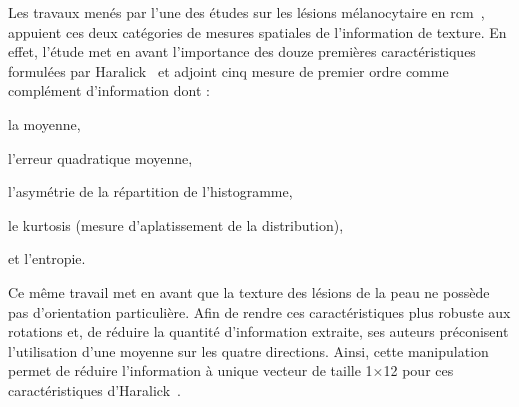 Les travaux menés par l'une des études sur les lésions mélanocytaire en \gls{rcm}~\cite{Wiltgen2008}, appuient ces deux catégories de mesures spatiales de l'information de texture. En effet, l'étude met en avant l'importance des douze premières caractéristiques formulées par Haralick~\cite{Haralick1973} et adjoint cinq mesure de premier ordre comme complément d'information dont :
\begin{inlinerate}
    \item la moyenne,
    \item l'erreur quadratique moyenne,
    \item l'asymétrie de la répartition de l'histogramme,
    \item le kurtosis (mesure d'aplatissement de la distribution),
    \item et l'entropie.
\end{inlinerate}
Ce même travail met en avant que la texture des lésions de la peau ne possède pas d'orientation particulière. Afin de rendre ces caractéristiques plus robuste aux rotations et, de réduire la quantité d'information extraite, ses auteurs préconisent l'utilisation d'une moyenne sur les quatre directions. Ainsi, cette manipulation permet de réduire l'information à unique vecteur de taille 1$\times$12 pour ces caractéristiques d'Haralick~\cite{Wiltgen2008}.\par


